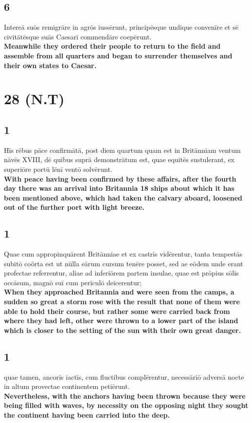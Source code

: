 \documentclass{article}
\begin{document}
\subsection*{6}
Intereā suōs remigrāre in agrōs iussērunt, principēsque undique convenīre et sē civitātēsque suās Caesarī commendāre coepērunt.\\
\textbf{Meanwhile they ordered their people to return to the field and assemble from all quarters and began to surrender themselves and their own states to Caesar.}

\section*{28 (N.T)}
\subsection*{1}
Hīs rēbus pāce confirmātā, post diem quartum quam est in Britānniam ventum nāvēs XVIII, dē quibus suprā demonstrātum est, quae equitēs sustulerant, ex superiōre portū lēnī ventō solvērunt. \\
\textbf{With peace having been confirmed by these affairs, after the fourth day there was an arrival into Britannia 18 ships about which it has been mentioned above, which had taken the calvary aboard, loosened out of the further port with light breeze. }

\subsection*{1}
Quae cum appropinquārent Britānniae et ex castrīs vidērentur, tanta tempestās subitō coörta est ut nūlla eārum cursum tenēre posset, sed ae eōdem unde erant profectae referrentur, aliae ad inferiōrem partem insulae, quae est prōpius sōlis occāsum, magnō suī cum perīculō deicerentur; \\
\textbf{When they approached Britannia and were seen from the camps, a sudden so great a storm rose with the result that none of them were able to hold their course, but rather some were carried back from where they had left, other were thrown to a lower part of the island which is closer to the setting of the sun with their own great danger.}

\subsection*{1}
quae tamen, ancorīs iactīs, cum fluctibus complērentur, necessāriō adversā nocte in altum provectae continentem petiērunt.\\
\textbf{Nevertheless, with the anchors having been thrown because they were being filled with waves, by necessity on the opposing night they sought the continent having been carried into the deep.}
\end{document}
